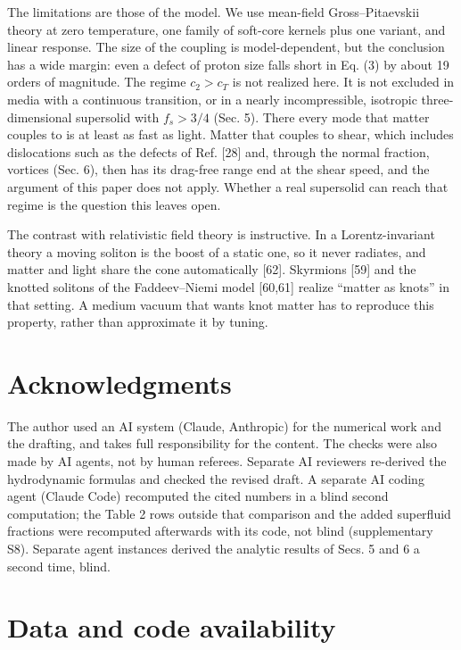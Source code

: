 \documentclass[
  11pt,
]{article}
\begin{document}
The limitations are those of the model. We use mean-field
Gross--Pitaevskii theory at zero temperature, one family of soft-core
kernels plus one variant, and linear response. The size of the coupling
is model-dependent, but the conclusion has a wide margin: even a defect
of proton size falls short in Eq. (3) by about 19 orders of magnitude.
The regime \(c_2>c_T\) is not realized here. It is not excluded in media
with a continuous transition, or in a nearly incompressible, isotropic
three-dimensional supersolid with \(f_s>3/4\) (Sec. 5). There every mode
that matter couples to is at least as fast as light. Matter that couples
to shear, which includes dislocations such as the defects of Ref.
{[}28{]} and, through the normal fraction, vortices (Sec. 6), then has
its drag-free range end at the shear speed, and the argument of this
paper does not apply. Whether a real supersolid can reach that regime is
the question this leaves open.

The contrast with relativistic field theory is instructive. In a
Lorentz-invariant theory a moving soliton is the boost of a static one,
so it never radiates, and matter and light share the cone automatically
{[}62{]}. Skyrmions {[}59{]} and the knotted solitons of the
Faddeev--Niemi model {[}60,61{]} realize ``matter as knots'' in that
setting. A medium vacuum that wants knot matter has to reproduce this
property, rather than approximate it by tuning.

\hypertarget{acknowledgments}{%
\section{Acknowledgments}\label{acknowledgments}}

The author used an AI system (Claude, Anthropic) for the numerical work
and the drafting, and takes full responsibility for the content. The
checks were also made by AI agents, not by human referees. Separate AI
reviewers re-derived the hydrodynamic formulas and checked the revised
draft. A separate AI coding agent (Claude Code) recomputed the cited
numbers in a blind second computation; the Table 2 rows outside that
comparison and the added superfluid fractions were recomputed afterwards
with its code, not blind (supplementary S8). Separate agent instances
derived the analytic results of Secs. 5 and 6 a second time, blind.

\hypertarget{data-and-code-availability}{%
\section{Data and code availability}\label{data-and-code-availability}}
\end{document}
